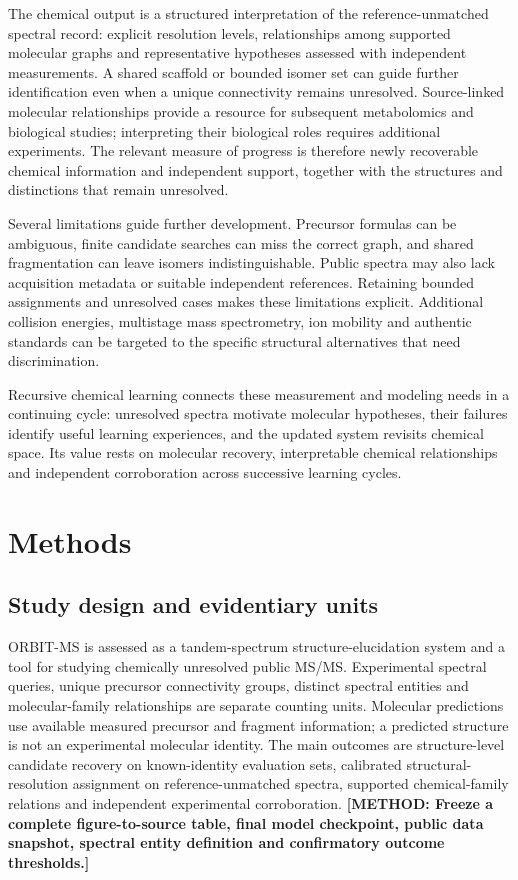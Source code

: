 \documentclass[11pt]{article}
\newcommand{\methodtodo}[1]{\textbf{\textcolor{orbitviolet}{[METHOD: #1]}}}
\begin{document}
The chemical output is a structured interpretation of the reference-unmatched spectral record: explicit resolution levels, relationships among supported molecular graphs and representative hypotheses assessed with independent measurements. A shared scaffold or bounded isomer set can guide further identification even when a unique connectivity remains unresolved. Source-linked molecular relationships provide a resource for subsequent metabolomics and biological studies; interpreting their biological roles requires additional experiments. The relevant measure of progress is therefore newly recoverable chemical information and independent support, together with the structures and distinctions that remain unresolved.

Several limitations guide further development. Precursor formulas can be ambiguous, finite candidate searches can miss the correct graph, and shared fragmentation can leave isomers indistinguishable. Public spectra may also lack acquisition metadata or suitable independent references. Retaining bounded assignments and unresolved cases makes these limitations explicit. Additional collision energies, multistage mass spectrometry, ion mobility and authentic standards can be targeted to the specific structural alternatives that need discrimination.

Recursive chemical learning connects these measurement and modeling needs in a continuing cycle: unresolved spectra motivate molecular hypotheses, their failures identify useful learning experiences, and the updated system revisits chemical space. Its value rests on molecular recovery, interpretable chemical relationships and independent corroboration across successive learning cycles.

\section*{Methods}

\subsection*{Study design and evidentiary units}
ORBIT-MS is assessed as a tandem-spectrum structure-elucidation system and a tool for studying chemically unresolved public MS/MS. Experimental spectral queries, unique precursor connectivity groups, distinct spectral entities and molecular-family relationships are separate counting units. Molecular predictions use available measured precursor and fragment information; a predicted structure is not an experimental molecular identity. The main outcomes are structure-level candidate recovery on known-identity evaluation sets, calibrated structural-resolution assignment on reference-unmatched spectra, supported chemical-family relations and independent experimental corroboration. \methodtodo{Freeze a complete figure-to-source table, final model checkpoint, public data snapshot, spectral entity definition and confirmatory outcome thresholds.}
\end{document}
